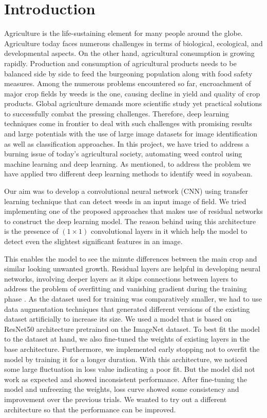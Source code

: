 \documentclass{report}
\begin{document}
\section{Introduction}
\label{sec:M5-intro}
Agriculture is the life-sustaining element for many people around the globe. Agriculture today faces numerous challenges in terms of biological, ecological, and developmental aspects. On the other hand, agricultural consumption is growing rapidly. Production and consumption of agricultural products needs to be balanced side by side to feed the burgeoning population along with food safety measures. Among the numerous problems encountered so far, encroachment of major crop fields by weeds is the one, causing decline in yield and quality of crop products. Global agriculture demands more scientific study yet practical solutions to successfully combat the pressing challenges. Therefore, deep learning techniques come in frontier to deal with such challenges with promising results and large potentials with the use of large image datasets for image identification as well as classification approaches. In this project, we have tried to address a burning issue of today's agricultural society, automating weed control using machine learning and deep learning. As mentioned, to address the problem we have applied two different deep learning methods to identify weed in soyabean.  

 Our aim was to develop a convolutional neural network (CNN) using transfer learning technique that can detect weeds in an input image of field. We tried implementing one of the proposed approaches that makes use of residual networks to construct the deep learning model. The reason behind using this architecture is the presence of $(1\times1)$ convolutional layers in it which help the model to detect even the slightest significant features in an image.  

This enables the model to see the minute differences between the main crop and similar looking unwanted growth. Residual layers are helpful in developing neural networks, involving deeper layers as it skips connections between layers to address the problem of overfitting and vanishing gradient during the training phase \cite{szegedy2017inception}. As the dataset used for training was comparatively smaller, we had to use data augmentation techniques that generated different versions of the existing dataset artificially to increase its size. We used a model that is based on ResNet50 architecture pretrained on the ImageNet dataset. To best fit the model to the dataset at hand, we also fine-tuned the weights of existing layers in the base architecture. Furthermore, we implemented early stopping not to overfit the model by training it for a longer duration. With this architecture, we noticed some large fluctuation in loss value indicating a poor fit. But the model did not work as expected and showed inconsistent performance. After fine-tuning the model and unfreezing the weights, loss curve showed some consistency and improvement over the previous trials. We wanted to try out a different architecture so that the performance can be improved.  
\end{document}
